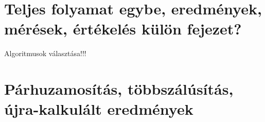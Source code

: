\section{Teljes folyamat egybe, eredmények, mérések, értékelés {\color{red} külön fejezet?}}

{\color{red} Algoritmusok választása!!!}

\section{Párhuzamosítás, többszálúsítás, újra-kalkulált eredmények}


